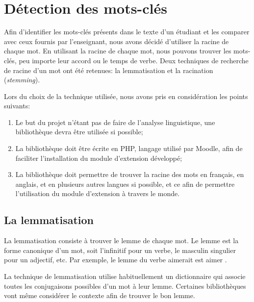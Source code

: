 \chapter{Détection des mots-clés}
\label{chap:keywords}

Afin d'identifier les mots-clés pr\'esents dans le texte d'un \'etudiant et les comparer avec ceux fournis par l'enseignant, nous avons décidé d'utiliser la racine de chaque mot.
En utilisant la racine de chaque mot, nous pouvons trouver les mots-clés, peu importe leur accord ou le temps de verbe.
Deux techniques de recherche de racine d'un mot ont été retenues: la lemmatisation et la racination (\textit{stemming}).


Lors du choix de la technique utilisée, nous avons pris en considération les points suivants:

\begin{enumerate}
  \item Le but du projet n'étant pas de faire de l'analyse linguistique, une biblioth\`eque devra être utilisée si possible;
  \item La biblioth\`eque doit être écrite en PHP, langage utilisé par Moodle, afin de faciliter l'installation du module d'extension développé;
  \item La biblioth\`eque doit permettre de trouver la racine des mots en français, en anglais, et en plusieurs autres langues si possible, et ce afin de permettre l'utilisation du module d'extension à travers le monde.
\end{enumerate}

\section{La lemmatisation}

La lemmatisation consiste à trouver le lemme de chaque mot.
Le lemme est la forme canonique d'un mot, soit l'infinitif pour un verbe, le masculin singulier pour un adjectif, etc.
Par exemple, le lemme du verbe \og aimerait \fg{} est \og aimer \fg{}.

La  technique de lemmatisation utilise habituellement un dictionnaire qui associe toutes les conjugaisons possibles d'un mot à leur lemme.
Certaines biblioth\`eques vont même considérer le contexte afin de trouver le bon lemme.

